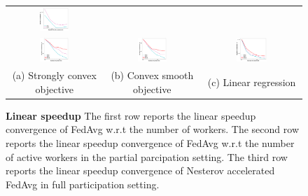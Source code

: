 \begin{figure}[t!]
\begin{tabular}{ccc}
\includegraphics[width=0.33\textwidth]{fig/paper-partiallinregressionspeedupNodesT-min-linearregressionw8a-epsilon002-reg0.pdf}\\
\hspace{-2em}\includegraphics[width=0.33\textwidth]{fig/paper-nesterovspeedupNodesT-min-w8a-epsilon0131-reg1e-05.pdf} & 
\includegraphics[width=0.33\textwidth]{fig/paper-nesterovspeedupNodesT-min-w8a-epsilon0134-reg0.pdf}
& 
\includegraphics[width=0.33\textwidth]{fig/paper-lrnesterovspeedupNodesT-min-linearregressionw8a-epsilon002-reg0.pdf}\\
(a) Strongly convex objective & (b) Convex smooth objective & (c) Linear regression
	\end{tabular}
\caption{\textbf{Linear speedup} The first row reports the linear speedup convergence of FedAvg w.r.t the number of workers. The second row reports the linear speedup convergence of FedAvg w.r.t the number of active workers in the partial parcipation setting. The third row reports the linear speedup convergence of Nesterov accelerated FedAvg in full participation setting. }
\label{fig:speedup}
\end{figure}

